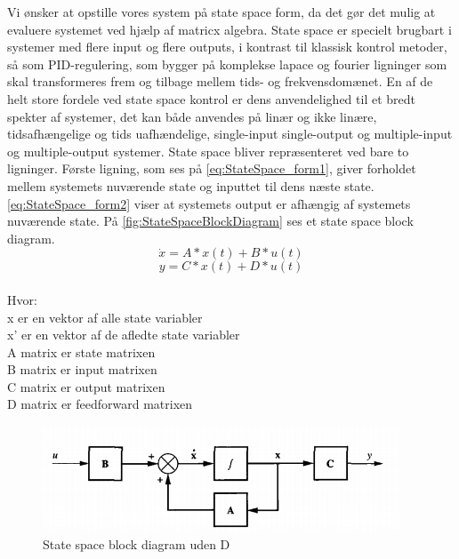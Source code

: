 Vi ønsker at opstille vores system på state space form, da det gør det mulig at evaluere systemet ved hjælp af matricx algebra. State space er specielt brugbart i systemer med flere input og flere outputs, i kontrast til klassisk kontrol metoder, så som PID-regulering, som bygger på komplekse lapace og fourier ligninger som skal transformeres frem og tilbage mellem tids- og frekvensdomænet. 
En af de helt store fordele ved state space kontrol er dens anvendelighed til et bredt spekter af systemer, det kan både anvendes på linær og ikke linære, tidsafhængelige og tids uafhændelige, single-input single-output og multiple-input og multiple-output systemer.
State space bliver repræsenteret ved bare to ligninger. Første ligning, som ses på \autoref{eq:StateSpace_form1}, giver forholdet mellem systemets nuværende state og inputtet til dens næste state. \autoref{eq:StateSpace_form2} viser at systemets output er afhængig af systemets nuværende state. På \autoref{fig:StateSpaceBlockDiagram} ses et state space block diagram. \begin{equation}
\dot{x} = A * x(t) + B * u(t)
\label{eq:StateSpace_form1}
\end{equation}
\begin{equation}
y = C * x(t) + D * u(t)
\label{eq:StateSpace_form2}
\end{equation}
\\
Hvor:\\
x er en vektor af alle state variabler\\
x' er en vektor af de afledte state variabler\\
A matrix er state matrixen  \\
B matrix er input matrixen \\
C matrix er output matrixen\\
D matrix er feedforward matrixen\\

\begin{figure}[H]
	\centering
	\includegraphics[width = 300pt]{Img/StateSpaceBlockDiagram.PNG}
	\caption{State space block diagram uden D}
	\label{fig:StateSpaceBlockDiagram}
\end{figure}



